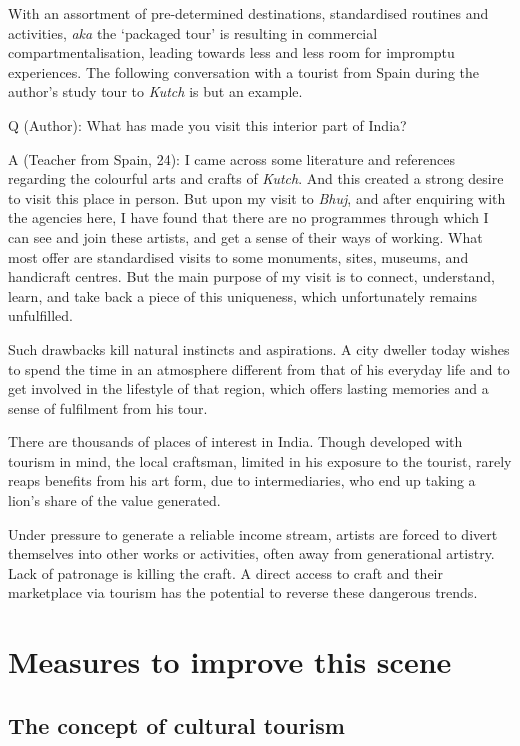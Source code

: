 With an assortment of pre-determined destinations, standardised routines and activities, \emph{aka} the `packaged tour' is resulting in commercial compartmentalisation, leading towards less and less room for impromptu experiences. The following conversation with a tourist from Spain during the author's study tour to \emph{Kutch} is but an example.

Q (Author): What has made you visit this interior part of India?

A (Teacher from Spain, 24): I came across some literature and references regarding the colourful arts and crafts of \emph{Kutch}. And this created a strong desire to visit this place in person. But upon my visit to \emph{Bhuj}, and after enquiring with the agencies here, I have found that there are no programmes through which I can see and join these artists, and get a sense of their ways of working. What most offer are standardised visits to some monuments, sites, museums, and handicraft centres. But the main purpose of my visit is to connect, understand, learn, and take back a piece of this uniqueness, which unfortunately remains unfulfilled.

Such drawbacks kill natural instincts and aspirations. A city dweller today wishes to spend the time in an atmosphere different from that of his everyday life and to get involved in the lifestyle of that region, which offers lasting memories and a sense of fulfilment from his tour.

There are thousands of places of interest in India. Though developed with tourism in mind, the local craftsman, limited in his exposure to the tourist, rarely reaps benefits from his art form, due to intermediaries, who end up taking a lion's share of the value generated.

Under pressure to generate a reliable income stream, artists are forced to divert themselves into other works or activities, often away from generational artistry. Lack of patronage is killing the craft. A direct access to craft and their marketplace via tourism has the potential to reverse these dangerous trends.


\section{Measures to improve this scene} %
\label{sec:measures}

\subsection{The concept of cultural tourism} %
\label{sub:concept_ct}

